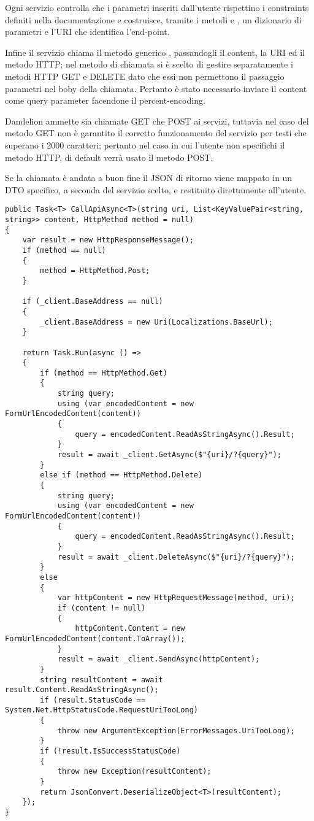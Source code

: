 Ogni servizio controlla che i parametri inseriti dall'utente rispettino i constraints definiti nella documentazione e costruisce, tramite i metodi  e  
, un dizionario di parametri e l'URI che identifica l'end-point. 

Infine il servizio chiama il metodo generico , passandogli il content, la URI ed il metodo HTTP; 
nel metodo di chiamata si è scelto di gestire separatamente i metodi HTTP GET e DELETE dato che essi non permettono il passaggio parametri nel boby 
della chiamata. Pertanto è stato necessario inviare il content come query parameter facendone il percent-encoding.

Dandelion ammette sia chiamate GET che POST ai servizi, tuttavia nel caso del metodo GET non è garantito il corretto 
funzionamento del servizio per testi che superano i 2000 caratteri; pertanto nel caso in cui l'utente non specifichi il metodo HTTP, di default verrà
usato il metodo POST.

Se la chiamata è andata a buon fine il JSON di ritorno viene mappato in un DTO specifico, a seconda del servizio scelto, e restituito direttamente all'utente.

\begin{lstlisting}[style=CSharpStyle, caption=Metodo generico del client per le chiamate HTTP]
public Task<T> CallApiAsync<T>(string uri, List<KeyValuePair<string, string>> content, HttpMethod method = null)
{
    var result = new HttpResponseMessage();
    if (method == null)
    {
        method = HttpMethod.Post;
    }

    if (_client.BaseAddress == null)
    {
        _client.BaseAddress = new Uri(Localizations.BaseUrl);
    }

    return Task.Run(async () =>
    {
        if (method == HttpMethod.Get)
        {
            string query;
            using (var encodedContent = new FormUrlEncodedContent(content))
            {
                query = encodedContent.ReadAsStringAsync().Result;
            }
            result = await _client.GetAsync($"{uri}/?{query}");
        }
        else if (method == HttpMethod.Delete)
        {
            string query;
            using (var encodedContent = new FormUrlEncodedContent(content))
            {
                query = encodedContent.ReadAsStringAsync().Result;
            }
            result = await _client.DeleteAsync($"{uri}/?{query}");
        }
        else
        {
            var httpContent = new HttpRequestMessage(method, uri);
            if (content != null)
            {
                httpContent.Content = new FormUrlEncodedContent(content.ToArray());
            }
            result = await _client.SendAsync(httpContent);
        }
        string resultContent = await result.Content.ReadAsStringAsync();
        if (result.StatusCode == System.Net.HttpStatusCode.RequestUriTooLong)
        {
            throw new ArgumentException(ErrorMessages.UriTooLong);
        }
        if (!result.IsSuccessStatusCode)
        {
            throw new Exception(resultContent); 
        }
        return JsonConvert.DeserializeObject<T>(resultContent);
    });
}
\end{lstlisting}

